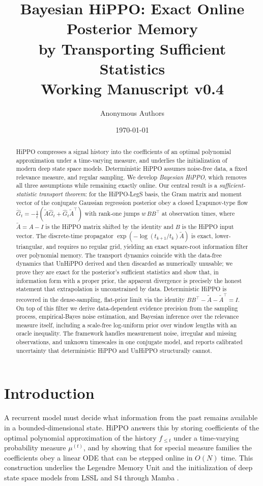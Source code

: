 \documentclass[11pt]{article}
\title{Bayesian HiPPO: Exact Online Posterior Memory\\ by Transporting Sufficient Statistics\\\large Working Manuscript v0.4}
\author{Anonymous Authors}
\date{\today}
\newcommand{\mut}{\mu^{(t)}}
\newcommand{\At}{\widetilde{A}}
\newcommand{\Gh}{\widehat{G}}
\begin{document}
\maketitle

\begin{abstract}
HiPPO compresses a signal history into the coefficients of an optimal polynomial approximation under a time-varying measure, and underlies the initialization of modern deep state space models. Deterministic HiPPO assumes noise-free data, a fixed relevance measure, and regular sampling. We develop \emph{Bayesian HiPPO}, which removes all three assumptions while remaining exactly online. Our central result is a \emph{sufficient-statistic transport theorem}: for the HiPPO-LegS basis, the Gram matrix and moment vector of the conjugate Gaussian regression posterior obey a closed Lyapunov-type flow $\dot{\Gh}_t=-\tfrac1t(\At\Gh_t+\Gh_t\At^\top)$ with rank-one jumps $w\,BB^\top$ at observation times, where $\At=A-I$ is the HiPPO matrix shifted by the identity and $B$ is the HiPPO input vector. The discrete-time propagator $\exp(-\log(t_{k+1}/t_k)\At)$ is exact, lower-triangular, and requires no regular grid, yielding an exact square-root information filter over polynomial memory. The transport dynamics coincide with the data-free dynamics that UnHiPPO \citep{lienen2025unhippo} derived and then discarded as numerically unusable; we prove they are exact for the posterior's sufficient statistics and show that, in information form with a proper prior, the apparent divergence is precisely the honest statement that extrapolation is unconstrained by data. Deterministic HiPPO is recovered in the dense-sampling, flat-prior limit via the identity $BB^\top-\At-\At^\top=I$. On top of this filter we derive data-dependent evidence precision from the sampling process, empirical-Bayes noise estimation, and Bayesian inference over the relevance measure itself, including a scale-free log-uniform prior over window lengths with an oracle inequality. The framework handles measurement noise, irregular and missing observations, and unknown timescales in one conjugate model, and reports calibrated uncertainty that deterministic HiPPO and UnHiPPO structurally cannot.
\end{abstract}

\section{Introduction}

A recurrent model must decide what information from the past remains available in a bounded-dimensional state. HiPPO \citep{gu2020hippo} answers this by storing coefficients of the optimal polynomial approximation of the history $f_{\le t}$ under a time-varying probability measure $\mut$, and by showing that for special measure families the coefficients obey a linear ODE that can be stepped online in $O(N)$ time. This construction underlies the Legendre Memory Unit \citep{voelker2019lmu} and the initialization of deep state space models from LSSL and S4 through Mamba \citep{gu2021lssl,gu2022s4,smith2023s5,gu2023mamba}.
\end{document}
